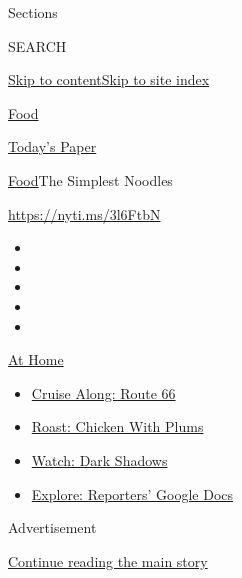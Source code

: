Sections

SEARCH

\protect\hyperlink{site-content}{Skip to
content}\protect\hyperlink{site-index}{Skip to site index}

\href{https://www.nytimes3xbfgragh.onion/section/food}{Food}

\href{https://myaccount.nytimes3xbfgragh.onion/auth/login?response_type=cookie\&client_id=vi}{}

\href{https://www.nytimes3xbfgragh.onion/section/todayspaper}{Today's
Paper}

\href{/section/food}{Food}\textbar{}The Simplest Noodles

\url{https://nyti.ms/3l6FtbN}

\begin{itemize}
\item
\item
\item
\item
\item
\end{itemize}

\href{https://www.nytimes3xbfgragh.onion/spotlight/at-home?action=click\&pgtype=Article\&state=default\&region=TOP_BANNER\&context=at_home_menu}{At
Home}

\begin{itemize}
\tightlist
\item
  \href{https://www.nytimes3xbfgragh.onion/2020/09/07/travel/route-66.html?action=click\&pgtype=Article\&state=default\&region=TOP_BANNER\&context=at_home_menu}{Cruise
  Along: Route 66}
\item
  \href{https://www.nytimes3xbfgragh.onion/2020/09/04/dining/sheet-pan-chicken.html?action=click\&pgtype=Article\&state=default\&region=TOP_BANNER\&context=at_home_menu}{Roast:
  Chicken With Plums}
\item
  \href{https://www.nytimes3xbfgragh.onion/2020/09/04/arts/television/dark-shadows-stream.html?action=click\&pgtype=Article\&state=default\&region=TOP_BANNER\&context=at_home_menu}{Watch:
  Dark Shadows}
\item
  \href{https://www.nytimes3xbfgragh.onion/interactive/2020/at-home/even-more-reporters-editors-diaries-lists-recommendations.html?action=click\&pgtype=Article\&state=default\&region=TOP_BANNER\&context=at_home_menu}{Explore:
  Reporters' Google Docs}
\end{itemize}

Advertisement

\protect\hyperlink{after-top}{Continue reading the main story}

